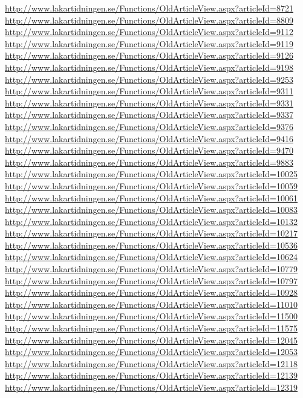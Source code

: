 \documentclass[a4paper]{report}
\begin{document}
\begin{appendices}
\begin{footnotesize}
\url{http://www.lakartidningen.se/Functions/OldArticleView.aspx?articleId=8721}
\url{http://www.lakartidningen.se/Functions/OldArticleView.aspx?articleId=8809}
\url{http://www.lakartidningen.se/Functions/OldArticleView.aspx?articleId=9112}
\url{http://www.lakartidningen.se/Functions/OldArticleView.aspx?articleId=9119}
\url{http://www.lakartidningen.se/Functions/OldArticleView.aspx?articleId=9126}
\url{http://www.lakartidningen.se/Functions/OldArticleView.aspx?articleId=9198}
\url{http://www.lakartidningen.se/Functions/OldArticleView.aspx?articleId=9253}
\url{http://www.lakartidningen.se/Functions/OldArticleView.aspx?articleId=9311}
\url{http://www.lakartidningen.se/Functions/OldArticleView.aspx?articleId=9331}
\url{http://www.lakartidningen.se/Functions/OldArticleView.aspx?articleId=9337}
\url{http://www.lakartidningen.se/Functions/OldArticleView.aspx?articleId=9376}
\url{http://www.lakartidningen.se/Functions/OldArticleView.aspx?articleId=9416}
\url{http://www.lakartidningen.se/Functions/OldArticleView.aspx?articleId=9470}
\url{http://www.lakartidningen.se/Functions/OldArticleView.aspx?articleId=9883}
\url{http://www.lakartidningen.se/Functions/OldArticleView.aspx?articleId=10025}
\url{http://www.lakartidningen.se/Functions/OldArticleView.aspx?articleId=10059}
\url{http://www.lakartidningen.se/Functions/OldArticleView.aspx?articleId=10061}
\url{http://www.lakartidningen.se/Functions/OldArticleView.aspx?articleId=10083}
\url{http://www.lakartidningen.se/Functions/OldArticleView.aspx?articleId=10132}
\url{http://www.lakartidningen.se/Functions/OldArticleView.aspx?articleId=10217}
\url{http://www.lakartidningen.se/Functions/OldArticleView.aspx?articleId=10536}
\url{http://www.lakartidningen.se/Functions/OldArticleView.aspx?articleId=10624}
\url{http://www.lakartidningen.se/Functions/OldArticleView.aspx?articleId=10779}
\url{http://www.lakartidningen.se/Functions/OldArticleView.aspx?articleId=10797}
\url{http://www.lakartidningen.se/Functions/OldArticleView.aspx?articleId=10928}
\url{http://www.lakartidningen.se/Functions/OldArticleView.aspx?articleId=11010}
\url{http://www.lakartidningen.se/Functions/OldArticleView.aspx?articleId=11500}
\url{http://www.lakartidningen.se/Functions/OldArticleView.aspx?articleId=11575}
\url{http://www.lakartidningen.se/Functions/OldArticleView.aspx?articleId=12045}
\url{http://www.lakartidningen.se/Functions/OldArticleView.aspx?articleId=12053}
\url{http://www.lakartidningen.se/Functions/OldArticleView.aspx?articleId=12118}
\url{http://www.lakartidningen.se/Functions/OldArticleView.aspx?articleId=12139}
\url{http://www.lakartidningen.se/Functions/OldArticleView.aspx?articleId=12319}

\end{footnotesize}
\end{appendices}
\end{document}
